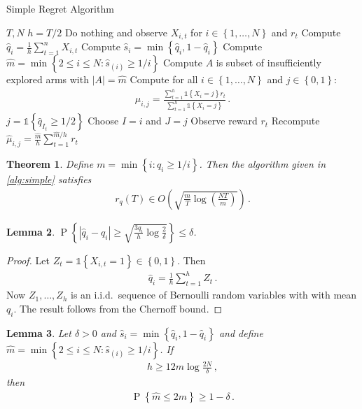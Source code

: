 \documentclass{article}
\newcommand{\set}[1]{\left\{#1\right\}}
\newcommand{\ind}[1]{\mathds{1}\!\!\set{#1}}
\newcommand{\eq}[1]{\begin{align*}#1\end{align*}}
\renewcommand{\P}[1]{\operatorname{P}\left\{#1\right\}}
\theoremstyle{plain}
\newtheorem{theorem}{Theorem}
\newtheorem{lemma}[theorem]{Lemma}
\theoremstyle{definition}
\begin{document}
\begin{algorithm}[H]
\caption{Simple Regret Algorithm}\label{alg:simple}
\begin{algorithmic}[1]
 $T, N$
\State $h = T/2$
\State Do nothing and observe $X_{i,t}$ for $i \in \set{1,\ldots,N}$ and $r_t$
\EndFor
\State Compute $\hat q_i = \frac{1}{h} \sum_{t=1}^n X_{i,t}$
\State Compute $\hat s_i = \min\set{\hat q_i, 1 - \hat q_i}$
\State Compute $\hat m = \min\set{2 \leq i \leq N : \hat s_{(i)} \geq 1/i}$
\State Compute $A$ is subset of insufficiently explored arms with $|A| = \hat m$
\State Compute for all $i \in \set{1,\ldots,N}$ and $j \in \set{0,1}$:
\eq{
\hat \mu_{i,j} = \frac{\sum_{t=1}^h \ind{X_i = j} r_t}{\sum_{t=1}^h \ind{X_i = j}}\,.
}
\State $j = \ind{\hat q_{I_t} \geq 1/2}$
\State Choose $I = i$ and $J = j$
\State Observe reward $r_t$
\EndFor
\State Recompute $\hat \mu_{i,j} = \frac{\hat m}{h} \sum_{t=1}^{\hat m/h} r_t$ 
\EndFor
\end{algorithmic}
\end{algorithm}

\begin{theorem}\label{thm:simple-regret}
Define $m = \min\set{i : q_i \geq 1/i}$.
Then the algorithm given in \cref{alg:simple} satisfies
\eq{
r_q(T) \in O\left(\sqrt{\frac{m}{T} \log \left(\frac{NT}{m}\right)}\right)\,.
}
\end{theorem}

\begin{lemma}\label{lem:conc1}
$\displaystyle \P{\left|\hat q_i - q_i\right| \geq \sqrt{\frac{3q_i}{h} \log \frac{2}{\delta}}} \leq \delta$.
\end{lemma}

\begin{proof}
Let $Z_t = \ind{X_{i,t} = 1} \in \set{0,1}$.
Then
\eq{
\hat q_i = \frac{1}{h} \sum_{t=1}^{h} Z_t\,.
}
Now $Z_1,\ldots,Z_h$ is an i.i.d.\ sequence of Bernoulli random variables with with mean $q_i$. The result follows from the Chernoff bound.
\end{proof}

\begin{lemma}\label{lem:conc2}
Let $\delta >0$ and $\hat s_i = \min\set{\hat q_i, 1 - \hat q_i}$ and
define $\hat m = \min\set{2 \leq i \leq N : \hat s_{(i)} \geq 1/i}$.
If
\eq{
h \geq 12m \log\frac{2N}{\delta}\,,
}
then
\eq{
\P{\hat m \leq 2m} \geq 1 - \delta\,.
}
\end{lemma}
\end{document}
